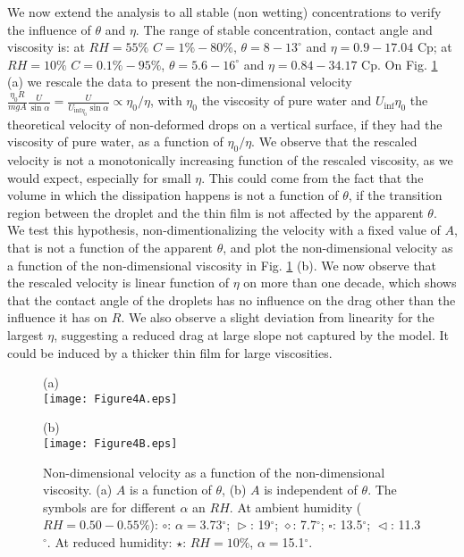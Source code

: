 \documentclass[aps,prl,reprint,superscriptaddress,amsmath,amssymb,]{revtex4-1}
\begin{document}
We now extend the analysis to all stable (non wetting) concentrations to verify the influence of $\theta$ and $\eta$. The range of stable concentration, contact angle and viscosity is:  at $RH=55\%$ $C=1\% -80 \%$, $\theta=8-13^\circ$ and $\eta=0.9-17.04$ Cp; at $RH=10\%$ $C=0.1\%-95\%$,  $\theta=5.6-16^\circ$ and $\eta=0.84-34.17$ Cp. On Fig. \ref{figure4} (a) we rescale the data to present the non-dimensional velocity $\frac{\eta_0 R}{mg A}\frac{U}{\sin \alpha}=\frac{U}{U_{\mathrm{inf}\eta_0} \sin \alpha} \propto \eta_0/\eta$, with $\eta_0$ the viscosity of pure water and $U_\mathrm{inf} \eta_0$ the theoretical velocity of non-deformed drops on a vertical surface, if they had the viscosity of pure water, as a function of $\eta_0 / \eta$. We observe that the rescaled velocity is not a monotonically increasing function of the rescaled viscosity, as we would expect, especially for small $\eta$. This could come from the fact that the volume in which the dissipation happens is not a function of $\theta$, if the transition region between the droplet and the thin film is not affected by the apparent $\theta$. We test this hypothesis, non-dimentionalizing the velocity with a fixed value of $A$, that is not a function of the apparent $\theta$, and plot the non-dimensional velocity as a function of the non-dimensional viscosity in Fig. \ref{figure4} (b). We now observe that the rescaled velocity is linear function of $\eta$ on more than one decade, which shows that the contact angle of the droplets has no influence on the drag other than the influence it has on $R$. We also observe a slight deviation from linearity for the largest $\eta$, suggesting a reduced drag at large slope not captured by the model. It could be induced by a thicker thin film for large viscosities.\\

\begin{figure}
\begin{minipage}[t]{0.65\columnwidth}
\centering
 \hspace{0.2cm} (a) \\ \vspace{0cm}
\texttt{[image: Figure4A.eps]}
\end{minipage}
\begin{minipage}[t]{\columnwidth}
\centering
 \hspace{0.2cm} (b) \\ \vspace{0cm}
\texttt{[image: Figure4B.eps]}
\end{minipage}
\caption{Non-dimensional velocity as a function of the non-dimensional viscosity. (a) $A$ is a function of $\theta$, (b) $A$ is independent of $\theta$. The symbols are for different $\alpha$ an $RH$. At ambient humidity ($RH=0.50-0.55 \%$): $\circ$: $\alpha=$3.73$^\circ$; $\vartriangleright$:  19$^\circ$; $\diamond$: 7.7$^\circ$; $\square$: 13.5$^\circ$; $\vartriangleleft$: 11.3$^\circ$. At reduced humidity: $\star$: $RH=10\%$, $\alpha=$15.1$^\circ$. }
\label{figure4}
\end{figure}
\end{document}
